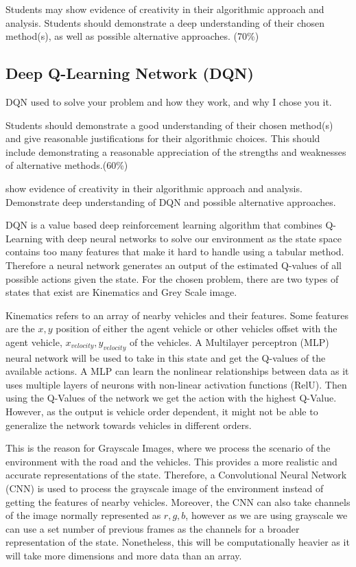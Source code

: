 \documentclass{article}
\begin{document}
Students may show evidence of creativity in their algorithmic approach and analysis. Students should demonstrate a deep understanding of their chosen method(s), as well as possible alternative approaches. (70\%)


\subsection{Deep Q-Learning Network (DQN)}

DQN used to solve your problem and how they work, and why I chose you it.

Students should demonstrate a good understanding of their chosen method(s) and give reasonable justifications for their algorithmic choices. 
This should include demonstrating a reasonable appreciation of the strengths and weaknesses of alternative methods.(60\%)

show evidence of creativity in their algorithmic approach and analysis.
Demonstrate deep understanding of DQN and possible alternative approaches. 

DQN is a value based deep reinforcement learning algorithm that combines Q-Learning with deep neural networks to solve our environment as the state space contains too many features that make it hard to handle using a tabular method.
Therefore a neural network generates an output of the estimated Q-values of all possible actions given the state.
For the chosen problem, there are two types of states that exist are Kinematics and Grey Scale image.

Kinematics refers to an array of nearby vehicles and their features. Some features are the \(x, y\) position of either the agent vehicle or other vehicles offset with the agent vehicle, \(x_{velocity}, y_{velocity}\) of the vehicles.
A Multilayer perceptron (MLP) neural network will be used to take in this state and get the Q-values of the available actions.
A MLP can learn the nonlinear relationships between data as it uses multiple layers of neurons with non-linear activation functions (RelU).
Then using the Q-Values of the network we get the action with the highest Q-Value.
However, as the output is vehicle order dependent, it might not be able to generalize the network towards vehicles in different orders.

This is the reason for Grayscale Images, where we process the scenario of the environment with the road and the vehicles.
This provides a more realistic and accurate representations of the state.
Therefore, a Convolutional Neural Network (CNN) is used to process the grayscale image of the environment instead of getting the features of nearby vehicles.
Moreover, the CNN can also take channels of the image normally represented as \(r,g,b\), however as we are using grayscale we can use a set number of previous frames as the channels for a broader representation of the state.
Nonetheless, this will be computationally heavier as it will take more dimensions and more data than an array.
\end{document}

